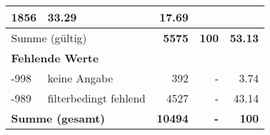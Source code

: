 \begin{longtable}{lXrrr}
       \num{1856} &
       \num[round-mode=places,round-precision=2]{33.29} &
         \num[round-mode=places,round-precision=2]{17.69} \\
     \midrule
     \multicolumn{2}{l}{Summe (gültig)} &
       \textbf{\num{5575}} &
     \textbf{\num{100}} &
       \textbf{\num[round-mode=places,round-precision=2]{53.13}} \\
     \multicolumn{5}{l}{\textbf{Fehlende Werte}}\\
       -998 &
       keine Angabe &
         \num{392} &
        - &
         \num[round-mode=places,round-precision=2]{3.74} \\
       -989 &
       filterbedingt fehlend &
         \num{4527} &
        - &
         \num[round-mode=places,round-precision=2]{43.14} \\
     \midrule
     \multicolumn{2}{l}{\textbf{Summe (gesamt)}} &
          \textbf{\num{10494}} &
        \textbf{-} &
        \textbf{\num{100}} \\
     \bottomrule
     \end{longtable}
     
